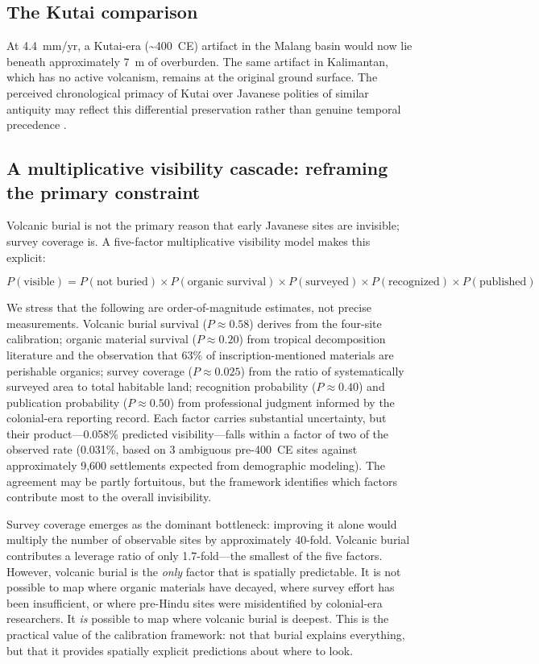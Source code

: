 \documentclass[12pt,a4paper]{article}
\begin{document}
\subsection{The Kutai comparison}

At 4.4~mm/yr, a Kutai-era (\textasciitilde400~CE) artifact in the Malang basin would now lie beneath approximately 7~m of overburden. The same artifact in Kalimantan, which has no active volcanism, remains at the original ground surface. The perceived chronological primacy of Kutai over Javanese polities of similar antiquity may reflect this differential preservation rather than genuine temporal precedence \citep{coedes1968}.

\subsection{A multiplicative visibility cascade: reframing the primary constraint}

Volcanic burial is not the primary reason that early Javanese sites are invisible; survey coverage is. A five-factor multiplicative visibility model makes this explicit:

\begin{equation}
  P(\text{visible}) = P(\text{not buried}) \times P(\text{organic survival}) \times P(\text{surveyed}) \times P(\text{recognized}) \times P(\text{published})
\end{equation}

We stress that the following are order-of-magnitude estimates, not precise measurements. Volcanic burial survival ($P \approx 0.58$) derives from the four-site calibration; organic material survival ($P \approx 0.20$) from tropical decomposition literature and the observation that 63\% of inscription-mentioned materials are perishable organics; survey coverage ($P \approx 0.025$) from the ratio of systematically surveyed area to total habitable land; recognition probability ($P \approx 0.40$) and publication probability ($P \approx 0.50$) from professional judgment informed by the colonial-era reporting record. Each factor carries substantial uncertainty, but their product---0.058\% predicted visibility---falls within a factor of two of the observed rate (0.031\%, based on 3 ambiguous pre-400~CE sites against approximately 9,600 settlements expected from demographic modeling). The agreement may be partly fortuitous, but the framework identifies which factors contribute most to the overall invisibility.

Survey coverage emerges as the dominant bottleneck: improving it alone would multiply the number of observable sites by approximately 40-fold. Volcanic burial contributes a leverage ratio of only 1.7-fold---the smallest of the five factors. However, volcanic burial is the \textit{only} factor that is spatially predictable. It is not possible to map where organic materials have decayed, where survey effort has been insufficient, or where pre-Hindu sites were misidentified by colonial-era researchers. It \textit{is} possible to map where volcanic burial is deepest. This is the practical value of the calibration framework: not that burial explains everything, but that it provides spatially explicit predictions about where to look.
\end{document}
